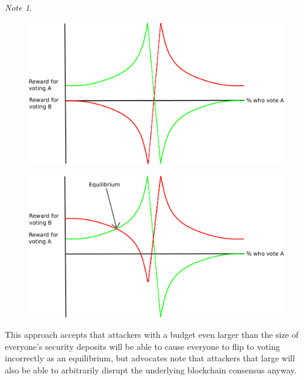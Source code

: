 \documentclass[11pt,a4paper]{report}
\theoremstyle{plain}
\theoremstyle{definition}
\theoremstyle{remark}
\newtheorem*{note}{Note}
\begin{document}
\begin{note}
\begin{figure}
\centering
\begin{minipage}{.5\textwidth}
  \centering
  \includegraphics[width=\linewidth]{figs/pdfs/schellingcoin_payoff1.pdf}
  \label{fig:unadulterated_truthcoin}
\end{minipage}%
\begin{minipage}{.5\textwidth}
  \centering
  \includegraphics[width=\linewidth]{figs/pdfs/schellingcoin_payoff2.pdf}
  \label{fig:bribed_truthcoin}
\end{minipage}
\end{figure}



This approach accepts that attackers with a budget even larger than the size of everyone's security deposits will be able to cause everyone to flip to voting incorrectly as an equilibrium, but advocates note that attackers that large will also be able to arbitrarily disrupt the underlying blockchain consensus anyway.


\end{note}
\end{document}
